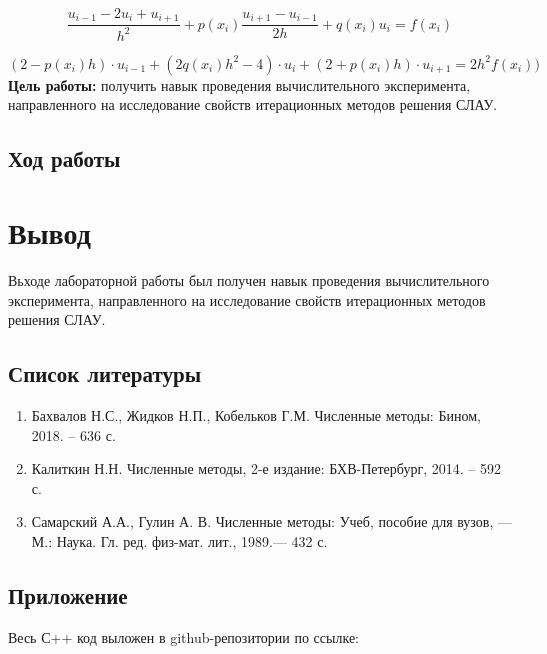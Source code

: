 \documentclass[a4paper, fontsize=14pt]{article}
\begin{document}
\begin{equation}
  \frac{u_{i-1} - 2 u_i + u_{i+1}}{h^2} + p(x_i) \frac{u_{i+1} - u_{i-1}}{2h} + q(x_i) u_i = f(x_i)
\end{equation}

\begin{equation}
  (2 - p(x_i) h) \cdot u_{i-1} + (2q(x_i)h^2 - 4) \cdot u_i + (2 + p(x_i) h  ) \cdot u_{i+1} = 2 h^2 f(x_i))
\end{equation}
% 
\textbf{Цель работы:}  получить навык проведения вычислительного
эксперимента, направленного на исследование свойств итерационных методов
решения СЛАУ.
\subsection*{{Ход работы}}
   \newpage
\section*{{Вывод}}
Вьходе лабораторной работы был получен навык проведения вычислительного
эксперимента, направленного на исследование свойств итерационных методов
решения СЛАУ.
\newpage
\subsection*{Список литературы}
\begin{enumerate}
    \item Бахвалов Н.С., Жидков Н.П., Кобельков Г.М. Численные методы: Бином, 2018. – 636 с. 
    \item Калиткин Н.Н. Численные методы, 2-е издание: БХВ-Петербург, 2014. – 592 с.
    \item Самарский А.А., Гулин А. В. Численные методы: Учеб, пособие для вузов, — М.: Наука. Гл. ред. физ-мат. лит., 1989.— 432 с.
\end{enumerate}
\newpage
\subsection*{Приложение}
Весь С++ код выложен в github-репозитории по ссылке: 

\end{document}
